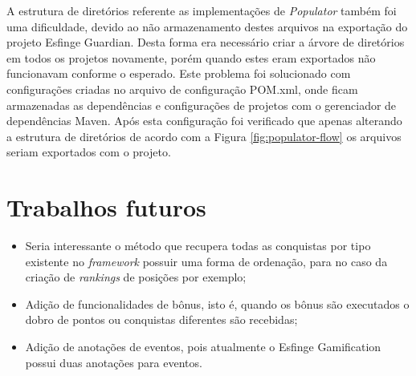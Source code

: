 \par A estrutura de diretórios referente as implementações de \textit{Populator} também foi uma dificuldade, devido ao não armazenamento destes arquivos na exportação do projeto Esfinge Guardian. Desta forma era necessário criar a árvore de diretórios em todos os projetos novamente, porém quando estes eram exportados não funcionavam conforme o esperado. Este problema foi solucionado com configurações criadas no arquivo de configuração POM.xml, onde ficam armazenadas as dependências e configurações de projetos com o gerenciador de dependências Maven. Após esta configuração foi verificado que apenas alterando a estrutura de diretórios de acordo com a Figura \ref{fig:populator-flow} os arquivos seriam exportados com o projeto.

\section{Trabalhos futuros}

\begin{itemize}
    \item Seria interessante o método que recupera todas as conquistas por tipo existente no \textit{framework} possuir uma forma de ordenação, para no caso da criação de \textit{rankings} de posições por exemplo;
    \item Adição de funcionalidades de bônus, isto é, quando os bônus são executados o dobro de pontos ou conquistas diferentes são recebidas;
    \item Adição de anotações de eventos, pois atualmente o Esfinge Gamification possui duas anotações para eventos.
    
\end{itemize}